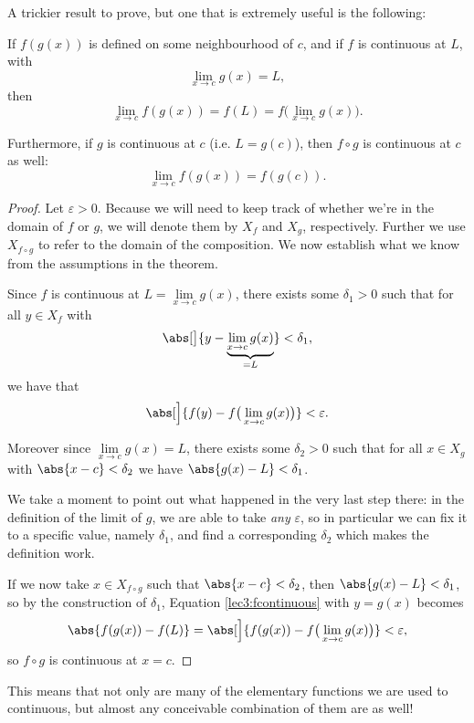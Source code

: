 \noindent
A trickier result to prove, but one that is extremely useful is the following:

\begin{theorem}
	If $f(g(x))$ is defined on some neighbourhood of $c$, and if $f$ is continuous at $L$, with
	\[
		\lim_{x \to c} g(x) = L,
	\]
	then
	\[
		\lim_{x \to c} f(g(x)) = f(L) = f \big ( \lim_{x \to c} g(x) \big ).
	\]

	\noindent
	Furthermore, if $g$ is continuous at $c$ (i.e. $L = g(c)$), then $f \circ g$ is continuous at $c$ as well:
	\[
		\lim_{x \to c} f(g(x)) = f(g(c)).
	\]
\end{theorem}

\begin{proof}
	Let $\varepsilon > 0$.
	Because we will need to keep track of whether we're in the domain of $f$ or $g$, we will denote them by $X_f$ and $X_g$, respectively.
	Further we use $X_{f \circ g}$ to refer to the domain of the composition.
	We now establish what we know from the assumptions in the theorem.

	Since $f$ is continuous at $L = \lim\limits_{x \to c} g(x)$, there exists some $\delta_1 > 0$ such that for all $y \in X_f$ with
	\[
		\abs[\big]{y - \underbrace{\lim_{x \to c} g(x)}_{= L}} < \delta_1,
	\]
	we have that
	\begin{equation}\label{lec3:fcontinuous}
		\abs[\Big]{f(y) - f \big ( \lim_{x \to c} g(x) \big ) } < \varepsilon.
	\end{equation}

	\noindent
	Moreover since $\lim\limits_{x \to c} g(x) = L$, there exists some $\delta_2 > 0$ such that for all $x \in X_g$ with $\abs{x - c} < \delta_2$ we have $\abs{g(x) - L} < \delta_1$.

	We take a moment to point out what happened in the very last step there: in the definition of the limit of $g$, we are able to take \emph{any} $\varepsilon$, so in particular we can fix it to a specific value, namely $\delta_1$, and find a corresponding $\delta_2$ which makes the definition work.

	If we now take $x \in X_{f \circ g}$ such that $\abs{x - c} < \delta_2$, then $\abs{g(x) - L} < \delta_1$, so by the construction of $\delta_1$, Equation \eqref{lec3:fcontinuous} with $y = g(x)$ becomes
	\[
		\abs{f(g(x)) - f(L)} = \abs[\Big]{f(g(x)) - f \big ( \lim_{x \to c} g(x) \big )} < \varepsilon,
	\]
	so $f \circ g$ is continuous at $x = c$.
\end{proof}

\noindent
This means that not only are many of the elementary functions we are used to continuous, but almost any conceivable combination of them are as well!


